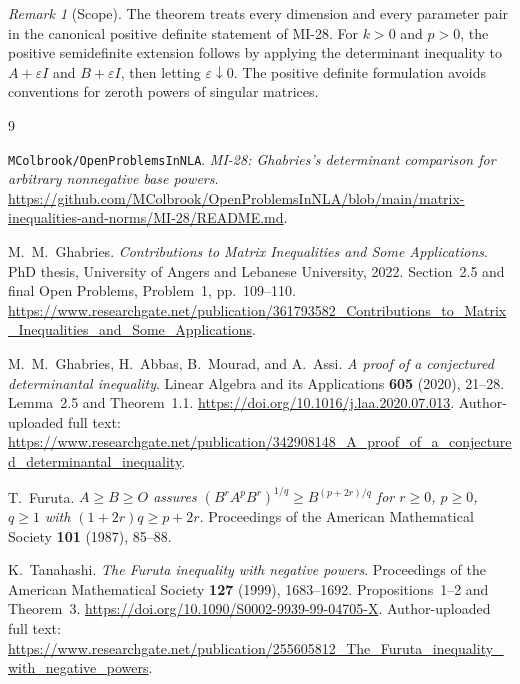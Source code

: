 \documentclass[11pt,a4paper]{article}
\theoremstyle{remark}
\newtheorem{remark}[theorem]{Remark}
\begin{document}
\begin{remark}[Scope]
The theorem treats every dimension and every parameter pair in
the canonical positive definite statement of MI-28.
For \(k>0\) and \(p>0\), the positive semidefinite extension follows
by applying the determinant inequality to \(A+\varepsilon I\) and
\(B+\varepsilon I\), then letting \(\varepsilon\downarrow0\).
The positive definite formulation avoids conventions for zeroth
powers of singular matrices.
\end{remark}

\begin{thebibliography}{9}

\texttt{MColbrook/OpenProblemsInNLA}.
\emph{MI-28: Ghabries's determinant comparison for arbitrary
nonnegative base powers}.
\url{https://github.com/MColbrook/OpenProblemsInNLA/blob/main/matrix-inequalities-and-norms/MI-28/README.md}.

M.~M.~Ghabries.
\emph{Contributions to Matrix Inequalities and Some Applications}.
PhD thesis, University of Angers and Lebanese University, 2022.
Section~2.5 and final Open Problems, Problem~1, pp.~109--110.
\url{https://www.researchgate.net/publication/361793582_Contributions_to_Matrix_Inequalities_and_Some_Applications}.

M.~M.~Ghabries, H.~Abbas, B.~Mourad, and A.~Assi.
\emph{A proof of a conjectured determinantal inequality}.
Linear Algebra and its Applications \textbf{605} (2020), 21--28.
Lemma~2.5 and Theorem~1.1.
\url{https://doi.org/10.1016/j.laa.2020.07.013}.
Author-uploaded full text:
\url{https://www.researchgate.net/publication/342908148_A_proof_of_a_conjectured_determinantal_inequality}.

T.~Furuta.
\emph{\(A\ge B\ge O\) assures
\((B^rA^pB^r)^{1/q}\ge B^{(p+2r)/q}\)
for \(r\ge0\), \(p\ge0\), \(q\ge1\) with
\((1+2r)q\ge p+2r\)}.
Proceedings of the American Mathematical Society
\textbf{101} (1987), 85--88.

K.~Tanahashi.
\emph{The Furuta inequality with negative powers}.
Proceedings of the American Mathematical Society
\textbf{127} (1999), 1683--1692.
Propositions~1--2 and Theorem~3.
\url{https://doi.org/10.1090/S0002-9939-99-04705-X}.
Author-uploaded full text:
\url{https://www.researchgate.net/publication/255605812_The_Furuta_inequality_with_negative_powers}.

\end{thebibliography}
\end{document}
